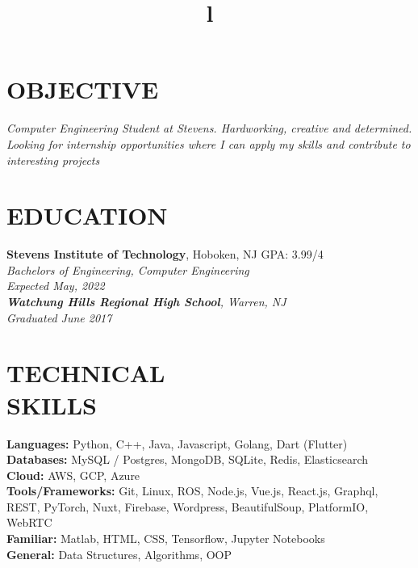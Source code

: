 \documentclass[margin]{res}
\begin{document}
\begin{resume}

\section{OBJECTIVE}
\sl{Computer Engineering Student at Stevens. Hardworking, creative and determined. 
  Looking for internship opportunities where I can apply my skills and contribute to interesting projects}

\section{EDUCATION}
\textbf{Stevens Institute of Technology}, Hoboken, NJ \hfill GPA: 3.99/4\\
\sl{Bachelors of Engineering}, Computer Engineering\\
Expected May, 2022 \\
\textbf{Watchung Hills Regional High School}, Warren, NJ\\
\sl{Graduated June 2017}

\section{TECHNICAL\\SKILLS}

\textbf{Languages: } Python, C++, Java, Javascript, Golang, Dart (Flutter)
\\
\textbf{Databases: } MySQL / Postgres, MongoDB, SQLite, Redis, Elasticsearch
\\
\textbf{Cloud: } AWS, GCP, Azure
\\
\textbf{Tools/Frameworks: } Git, Linux, ROS, Node.js, Vue.js, React.js, Graphql, REST,
PyTorch, Nuxt, Firebase, Wordpress, BeautifulSoup, PlatformIO, WebRTC
\\
\textbf{Familiar: } Matlab, HTML, CSS, Tensorflow, Jupyter Notebooks
\\
\textbf{General: } Data Structures, Algorithms, OOP

\begin{format}
\title{l}\\
\\
\body\\
\end{format}


\end{resume}
\end{document}
